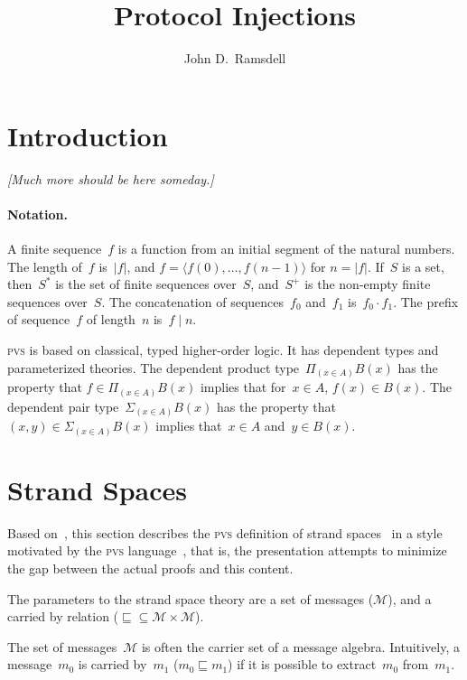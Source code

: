 \documentclass[12pt]{article}
\title{Protocol Injections}
\author{John D.\ Ramsdell}
\newcommand{\remark}[1]{\emph{[#1]}}
\newcommand{\pvs}{\textsc{pvs}}
\newcommand{\seq}[1]{\ensuremath{\langle#1\rangle}}
\newcommand{\prefix}[2]{#1\mid#2}
\newcommand{\append}{\cdot}
\newcommand{\dprod}[1]{\Pi_{(#1)}}
\newcommand{\dpair}[1]{\Sigma_{(#1)}}
\newcommand{\msg}{\ensuremath{\mathcal{M}}}
\begin{document}
\maketitle

\section{Introduction}

\remark{Much more should be here someday.}

\paragraph{Notation.}

A finite sequence~$f$ is a function from an initial segment of the
natural numbers.  The length of~$f$ is~$|f|$, and $f=\seq{f(0),\ldots,
  f(n-1)}$ for $n=|f|$.  If~$S$ is a set, then~$S^\ast$ is the set of
finite sequences over~$S$, and~$S^+$ is the non-empty finite sequences
over~$S$.  The concatenation of sequences~$f_0$ and~$f_1$
is~$f_0\append f_1$.  The prefix of sequence~$f$ of length~$n$
is~$\prefix{f}{n}$.

{\pvs} is based on classical, typed higher-order
logic.  It has dependent types and parameterized theories.
The dependent product type~$\dprod{x\in A}B(x)$ has the property that 
$f\in\dprod{x\in A}B(x)$ implies that for~$x\in A$, $f(x)\in B(x)$.
The dependent pair type~$\dpair{x\in A}B(x)$ has the property that 
$(x,y)\in\dpair{x\in A}B(x)$ implies that~$x\in A$ and~$y\in B(x)$.

\section{Strand Spaces}\label{sec:strand spaces}

Based on~\cite{Ramsdell13}, this section describes the {\pvs}
definition of strand spaces~\cite{ThayerHerzogGuttman99} in a style
motivated by the {\pvs} language~\cite{cade92-pvs}, that is, the
presentation attempts to minimize the gap between the actual proofs
and this content.

The parameters to the strand space theory are a set of messages
(\msg), and a carried by relation
(${\sqsubseteq}\subseteq\msg\times\msg$).

The set of messages~{\msg} is often the carrier set of a message
algebra.  Intuitively, a message~$m_0$ is carried by~$m_1$
($m_0\sqsubseteq m_1$) if it is possible to extract~$m_0$ from~$m_1$.
\end{document}
